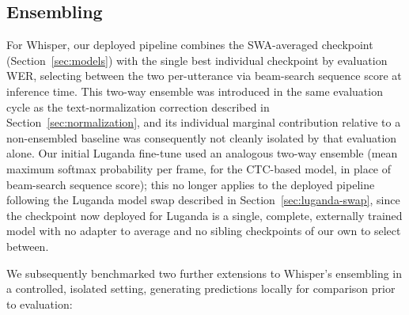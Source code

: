 \documentclass[11pt]{article}
\begin{document}
\subsection{Ensembling}
\label{sec:ensembling}

For Whisper, our deployed pipeline combines the SWA-averaged checkpoint (Section~\ref{sec:models}) with the single best individual checkpoint by evaluation WER, selecting between the two per-utterance via beam-search sequence score at inference time. This two-way ensemble was introduced in the same evaluation cycle as the text-normalization correction described in Section~\ref{sec:normalization}, and its individual marginal contribution relative to a non-ensembled baseline was consequently not cleanly isolated by that evaluation alone. Our initial Luganda fine-tune used an analogous two-way ensemble (mean maximum softmax probability per frame, for the CTC-based model, in place of beam-search sequence score); this no longer applies to the deployed pipeline following the Luganda model swap described in Section~\ref{sec:luganda-swap}, since the checkpoint now deployed for Luganda is a single, complete, externally trained model with no adapter to average and no sibling checkpoints of our own to select between.

We subsequently benchmarked two further extensions to Whisper's ensembling in a controlled, isolated setting, generating predictions locally for comparison prior to evaluation:
\end{document}
